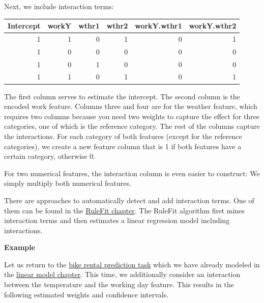 \documentclass[
  11pt,
]{scrbook}
\begin{document}
Next, we include interaction terms:

\begin{table}
\centering
\begin{tabular}{rrrrrr}
\toprule
Intercept & workY & wthr1 & wthr2 & workY.wthr1 & workY.wthr2\\
\midrule
1 & 1 & 0 & 1 & 0 & 1\\
1 & 0 & 0 & 0 & 0 & 0\\
1 & 0 & 1 & 0 & 0 & 0\\
1 & 1 & 0 & 1 & 0 & 1\\
\bottomrule
\end{tabular}
\end{table}

The first column serves to estimate the intercept.
The second column is the encoded work feature.
Columns three and four are for the weather feature, which requires two columns because you need two weights to capture the effect for three categories, one of which is the reference category.
The rest of the columns capture the interactions.
For each category of both features (except for the reference categories), we create a new feature column that is 1 if both features have a certain category, otherwise 0.

For two numerical features, the interaction column is even easier to construct:
We simply multiply both numerical features.

There are approaches to automatically detect and add interaction terms.
One of them can be found in the \protect\hyperlink{rulefit}{RuleFit chapter}.
The RuleFit algorithm first mines interaction terms and then estimates a linear regression model including interactions.

\textbf{Example}

Let us return to the \protect\hyperlink{bike-data}{bike rental prediction task} which we have already modeled in the \protect\hyperlink{limo}{linear model chapter}.
This time, we additionally consider an interaction between the temperature and the working day feature.
This results in the following estimated weights and confidence intervals.
\end{document}
